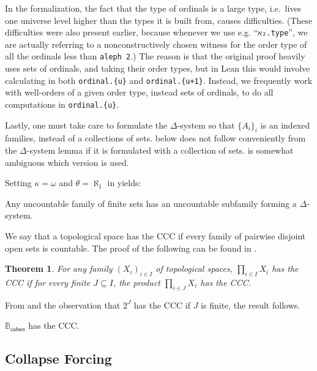 \documentclass[sigplan,screen]{acmart}
\newcommand{\B}{\mathbb{B}}
\newcommand{\lil}{\lstinline}
\newtheorem{thm}{Theorem}[section]
\theoremstyle{definition}
\begin{document}
In the formalization, the fact that the type of ordinals is a large type, i.e.\ lives one universe level higher than the types it is built from, causes difficulties. (These difficulties were also present earlier, because whenever we use e.g. ``\lil{ℵ₂.type}'', we are actually referring to a nonconstructively chosen witness for the order type of all the ordinals less than \lil{aleph 2}.)
The reason is that the original proof heavily uses sets of ordinals, and taking their order types, but in Lean this would involve calculating in both \lstinline"ordinal.{u}" and \lstinline"ordinal.{u+1}".
Instead, we frequently work with well-orders of a given order type, instead sets of ordinals, to do all computations in \lstinline"ordinal.{u}".

Lastly, one must take care to formulate the $\Delta$-system so that $\{A_i\}_i$ is an indexed families, instead of a collections of sets.
 below does not follow conveniently from the $\Delta$-system lemma if it is formulated with a collection of sets.
\cite{kunen2014set} is somewhat ambiguous which version is used.

Setting \(\kappa = \omega\) and \(\theta = \aleph_1\) in  yields:
\begin{lemma}\label{lemma:delta-system-lemma:simple}
  Any uncountable family of finite sets has an uncountable subfamily forming a $\Delta$-system.
\end{lemma}
We say that a topological space has the CCC if every family of pairwise disjoint open sets is countable. The proof of the following can be found in \cite{DBLP:conf/itp/HanD19}.
\begin{thm}\label{thm:product-ccc}
  For any family $(X_i)_{i\in I}$ of topological spaces, $\prod_{i\in I} X_i$ has the CCC if for every finite $J\subseteq I$, the product $\prod_{i\in J} X_i$ has the CCC.
\end{thm}
From  and the observation that $2^J$ has the CCC if $J$ is finite, the result follows.
\begin{lemma}\label{lemma:cohen-algebra-CCC}
  \(\B_{\mathsf{cohen}}\) has the CCC.
\end{lemma}

\subsection{Collapse Forcing} \label{subsect:collapse}
\end{document}
